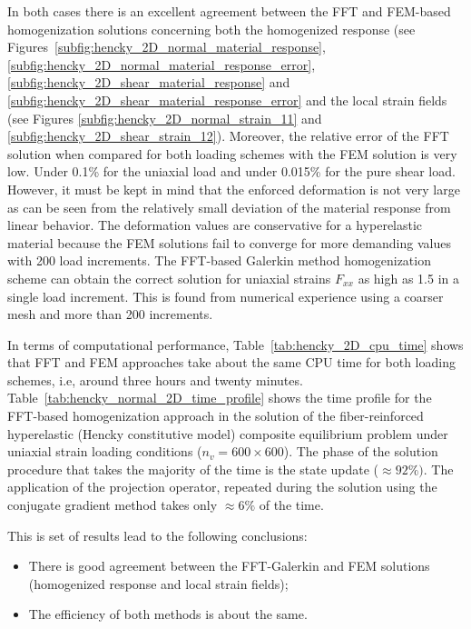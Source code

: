 In both cases there is an excellent agreement between the FFT and FEM-based homogenization solutions concerning both the homogenized response (see Figures~\ref{subfig:hencky_2D_normal_material_response}, \ref{subfig:hencky_2D_normal_material_response_error}, \ref{subfig:hencky_2D_shear_material_response} and \ref{subfig:hencky_2D_shear_material_response_error} and the local strain fields (see Figures \ref{subfig:hencky_2D_normal_strain_11} and \ref{subfig:hencky_2D_shear_strain_12}).
Moreover, the relative error of the FFT solution when compared for both loading schemes with the FEM solution is very low.
Under 0.1\% for the uniaxial load and under 0.015\% for the pure shear load.
However, it must be kept in mind that the enforced deformation is not very large as can be seen from the relatively small deviation of the material response from linear behavior.
The deformation values are conservative for a hyperelastic material because the FEM solutions fail to converge for more demanding values with 200 load increments.
The FFT-based Galerkin method homogenization scheme can obtain the correct solution for uniaxial strains \(F_{xx}\) as high as 1.5 in a single load increment.
This is found from numerical experience using a coarser mesh and more than 200 increments.

In terms of computational performance, Table~\ref{tab:hencky_2D_cpu_time} shows that FFT and FEM approaches take about the same CPU time for both loading schemes, i.e, around three hours and twenty minutes.
Table~\ref{tab:hencky_normal_2D_time_profile} shows the time profile for the FFT-based homogenization approach in the solution of the fiber-reinforced hyperelastic (Hencky constitutive model) composite equilibrium problem under uniaxial strain loading conditions (\(n_v=600\times 600\)).
The phase of the solution procedure that takes the majority of the time is the state update (\(\approx 92\%)\).
The application of the projection operator, repeated during the solution using the conjugate gradient method takes only \(\approx 6\%\) of the time.

This is set of results lead to the following conclusions:
\begin{itemize}
  \item There is good agreement between the FFT-Galerkin and FEM solutions (homogenized response and local strain fields);
  \item The efficiency of both methods is about the same.
\end{itemize}

